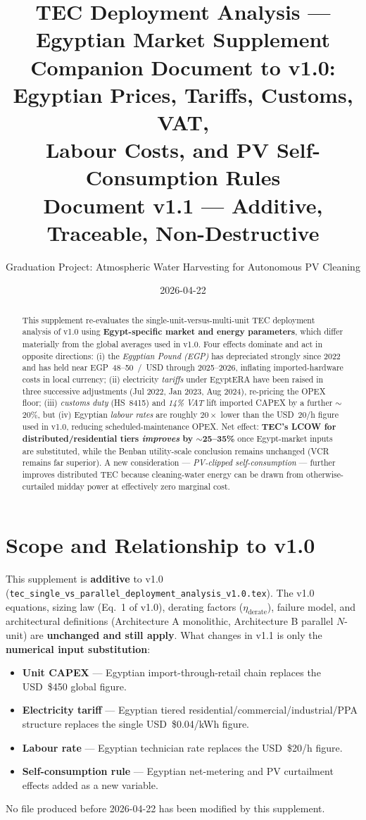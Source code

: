 \documentclass[11pt,a4paper]{article}
\title{\textbf{TEC Deployment Analysis --- Egyptian Market Supplement}\\
\large Companion Document to v1.0: Egyptian Prices, Tariffs, Customs, VAT,\\
Labour Costs, and PV Self-Consumption Rules\\
\normalsize Document v1.1 --- Additive, Traceable, Non-Destructive}
\author{Graduation Project: Atmospheric Water Harvesting for Autonomous PV Cleaning}
\date{2026-04-22}
\begin{document}
\maketitle

\begin{abstract}
\noindent
This supplement re-evaluates the single-unit-versus-multi-unit TEC deployment analysis of v1.0 using \textbf{Egypt-specific market and energy parameters}, which differ materially from the global averages used in v1.0. Four effects dominate and act in opposite directions: (i) the \emph{Egyptian Pound (EGP)} has depreciated strongly since 2022 and has held near \mbox{EGP~48--50 / USD} through 2025--2026, inflating imported-hardware costs in local currency; (ii) electricity \emph{tariffs} under EgyptERA have been raised in three successive adjustments (Jul 2022, Jan 2023, Aug 2024), re-pricing the OPEX floor; (iii) \emph{customs duty} (HS~8415) and \emph{14\% VAT} lift imported CAPEX by a further $\sim$20\%, but (iv) Egyptian \emph{labour rates} are roughly $20\times$ lower than the USD~20/h figure used in v1.0, reducing scheduled-maintenance OPEX. Net effect: \textbf{TEC's LCOW for distributed/residential tiers \emph{improves} by $\sim$25--35\%} once Egypt-market inputs are substituted, while the Benban utility-scale conclusion remains unchanged (VCR remains far superior). A new consideration --- \emph{PV-clipped self-consumption} --- further improves distributed TEC because cleaning-water energy can be drawn from otherwise-curtailed midday power at effectively zero marginal cost.
\end{abstract}

\tableofcontents
\bigskip

\section{Scope and Relationship to v1.0}
\label{sec:scope_v11}
This supplement is \textbf{additive} to v1.0 (\texttt{tec\_single\_vs\_parallel\_deployment\_analysis\_v1.0.tex}). The v1.0 equations, sizing law (Eq.~1 of v1.0), derating factors ($\eta_{\mathrm{derate}}$), failure model, and architectural definitions (Architecture A monolithic, Architecture B parallel $N$-unit) are \textbf{unchanged and still apply}. What changes in v1.1 is only the \textbf{numerical input substitution}:
\begin{itemize}[leftmargin=*]
  \item \textbf{Unit CAPEX} --- Egyptian import-through-retail chain replaces the USD~\$450 global figure.
  \item \textbf{Electricity tariff} --- Egyptian tiered residential/commercial/industrial/PPA structure replaces the single USD~\$0.04/kWh figure.
  \item \textbf{Labour rate} --- Egyptian technician rate replaces the USD~\$20/h figure.
  \item \textbf{Self-consumption rule} --- Egyptian net-metering and PV curtailment effects added as a new variable.
\end{itemize}
No file produced before 2026-04-22 has been modified by this supplement.
\end{document}
